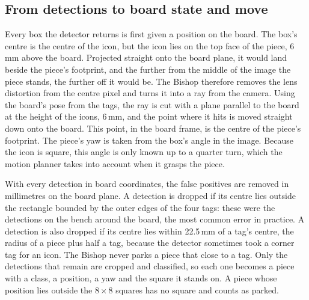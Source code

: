 \subsection{From detections to board state and move}
\label{subsec:board-state}

Every box the detector returns is first given a position on the board.
The box's centre is the centre of the icon, but the icon lies on the top face of the piece, 6\,mm above the board.
Projected straight onto the board plane, it would land beside the piece's footprint, and the further from the middle of the image the piece stands, the further off it would be.
The Bishop therefore removes the lens distortion from the centre pixel and turns it into a ray from the camera.
Using the board's pose from the tags, the ray is cut with a plane parallel to the board at the height of the icons, 6\,mm, and the point where it hits is moved straight down onto the board.
This point, in the board frame, is the centre of the piece's footprint.
The piece's yaw is taken from the box's angle in the image.
Because the icon is square, this angle is only known up to a quarter turn, which the motion planner takes into account when it grasps the piece.

With every detection in board coordinates, the false positives are removed in millimetres on the board plane.
A detection is dropped if its centre lies outside the rectangle bounded by the outer edges of the four tags: these were the detections on the bench around the board, the most common error in practice.
A detection is also dropped if its centre lies within 22.5\,mm of a tag's centre, the radius of a piece plus half a tag, because the detector sometimes took a corner tag for an icon.
The Bishop never parks a piece that close to a tag.
Only the detections that remain are cropped and classified, so each one becomes a piece with a class, a position, a yaw and the square it stands on.
A piece whose position lies outside the $8 \times 8$ squares has no square and counts as parked.

